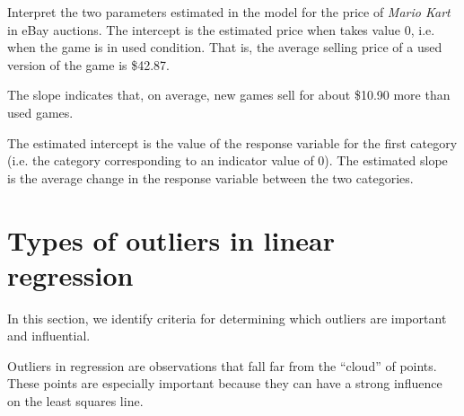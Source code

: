 \begin{example}{Interpret the two parameters estimated in the model for the price of \emph{Mario Kart} in eBay auctions.}
The intercept is the estimated price when  takes value 0, i.e. when the game is in used condition. That is, the average selling price of a used version of the game is \$42.87.

The slope indicates that, on average, new games sell for about \$10.90 more than used games.
\end{example}

\begin{tipBox}{
The estimated intercept is the value of the response variable for the first category (i.e. the category corresponding to an indicator value of 0). The estimated slope is the average change in the response variable between the two categories.}
\end{tipBox}



\section[Types of outliers in linear regression]{Types of outliers in linear regression }
\label{typesOfOutliersInLinearRegression}

In this section, we identify criteria for determining which outliers are important and influential.

Outliers in regression are observations that fall far from the ``cloud'' of points. These points are especially important because they can have a strong influence on the least squares line. 


